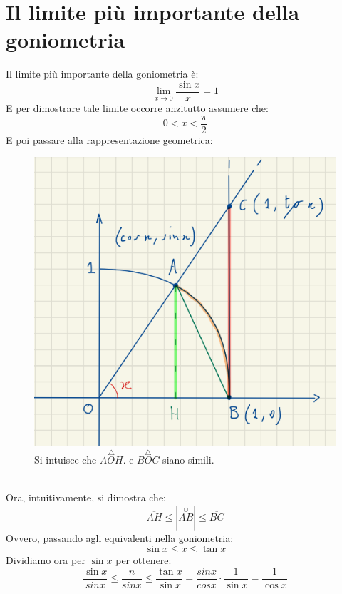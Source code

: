 \documentclass[12pt]{article}
\begin{document}
\section{Il limite più importante della goniometria}
Il limite più importante della goniometria è:
\begin{equation}
    \lim_{x \to 0} \dfrac{\sin{x}}{x} = 1 \label{lim:seno}
\end{equation}
E per dimostrare tale limite occorre anzitutto assumere che:
\[
    0 < x < \dfrac{\pi}{2}
\]
E poi passare alla rappresentazione geometrica:
\begin{figure}[!htb]
    \centering
    \includegraphics[width=1\textwidth, height=.5\textheight,keepaspectratio]{lezione_7/limite_seno_geometria.png}
    \begin{center}
        \caption{\label{fig:lim_seno_geometria}Si intuisce che \(\overset{\triangle}{AOH}\). e \(\overset{\triangle}{BOC}\) siano simili.}
    \end{center}
\end{figure}
\pagebreak
\\Ora, intuitivamente, si dimostra che:
\[  
    \overline{AH} \leq |\overset{\cup}{AB}| \leq \overline{BC}
\]
Ovvero, passando agli equivalenti nella goniometria:
\[
    \sin{x} \leq x \leq \tan{x}
\]
Dividiamo ora per $\sin{x}$ per ottenere:
\[
    \dfrac{\sin{x}}{sin{x}} \leq \dfrac{n}{sin{x}} \leq \dfrac{\tan{x}}{\sin{x}} = \dfrac{sin{x}}{cos{x}} \cdot \dfrac{1}{\sin{x}} = \dfrac{1}{\cos{x}}
\]
\end{document}
